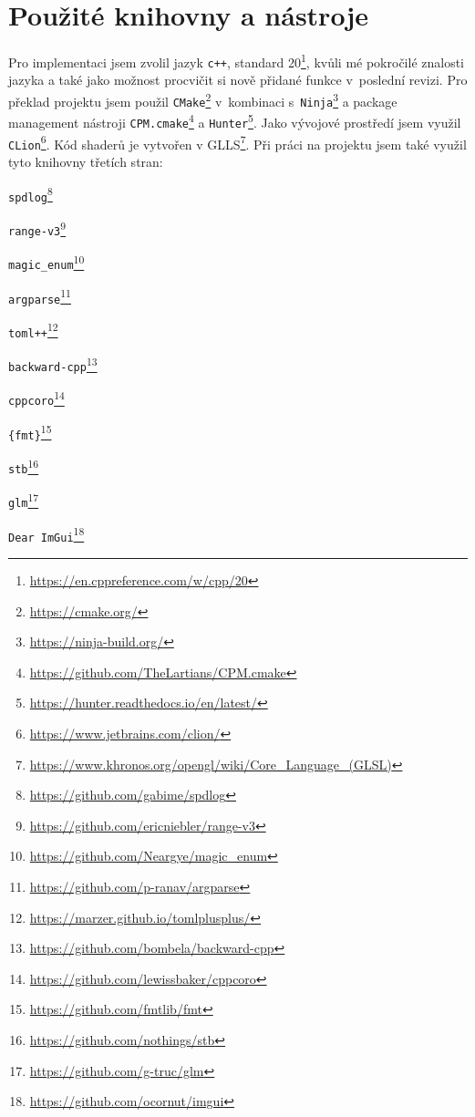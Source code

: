 \section{Použité knihovny a nástroje}
Pro implementaci jsem zvolil jazyk \texttt{c++}, standard 20\footnote{\url{https://en.cppreference.com/w/cpp/20}}, kvůli mé pokročilé znalosti jazyka a také jako možnost procvičit si nově přidané funkce v~poslední revizi. Pro překlad projektu jsem použil \texttt{CMake}\footnote{\url{https://cmake.org/}} v~kombinaci s~\texttt{Ninja}\footnote{\url{https://ninja-build.org/}} a package management nástroji \texttt{CPM.cmake}\footnote{\url{https://github.com/TheLartians/CPM.cmake}} a \texttt{Hunter}\footnote{\url{https://hunter.readthedocs.io/en/latest/}}. Jako vývojové prostředí jsem využil \texttt{CLion}\footnote{\url{https://www.jetbrains.com/clion/}}. Kód shaderů je vytvořen v GLLS\footnote{\url{https://www.khronos.org/opengl/wiki/Core_Language_(GLSL)}}. Při práci na projektu jsem také využil tyto knihovny třetích stran:

\begin{itemize}
\end{itemize}

